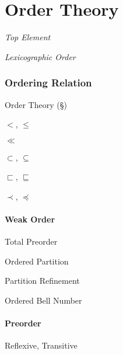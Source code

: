\part{Order Theory}\label{sec:order_theory}

\emph{Top Element}

\emph{Lexicographic Order}



\section{Ordering Relation}\label{sec:ordering_relation}

Order Theory (\S\ref{sec:order_theory})

$<$, $\leq$

$\ll$

$\subset$, $\subseteq$

$\sqsubset$, $\sqsubseteq$

$\prec$, $\preceq$



\subsection{Weak Order}\label{sec:weak_order}

Total Preorder

Ordered Partition

Partition Refinement %

Ordered Bell Number



\subsection{Preorder}\label{sec:preorder}

Reflexive, Transitive

